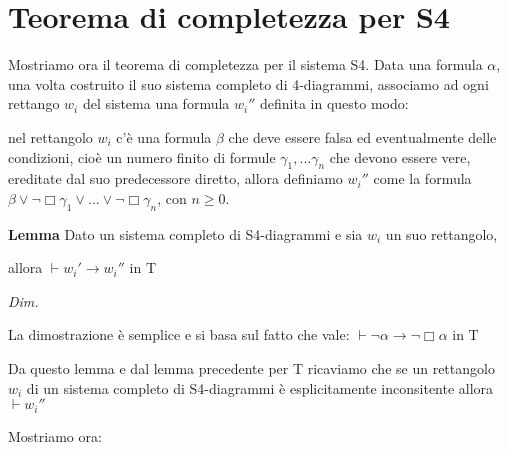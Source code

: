 \documentclass[a4paper, titlepage, 12pt]{report}
\begin{document}
\section{Teorema di completezza per S4}
Mostriamo ora il teorema di completezza per il sistema S4.
Data una formula $\alpha$, una volta costruito il suo sistema completo di 4-diagrammi,
associamo ad ogni rettango $w_i$ del sistema una formula $w_i''$ definita in questo modo:

nel rettangolo $w_i$ c'è una formula $\beta$ che deve essere falsa ed eventualmente delle condizioni,
cioè un numero finito di formule $\gamma_1, ...\gamma_n$ che devono essere vere, ereditate
dal suo predecessore diretto, allora definiamo $w_i''$ come la formula
$\beta \lor \neg \Box \gamma_1 \lor ... \lor \neg \Box \gamma_n$, con $n \geq 0$.

\begin{flushleft}
\textbf{Lemma}
Dato un sistema completo di S4-diagrammi e sia $w_i$ un suo rettangolo,

allora $\vdash w_i' \rightarrow w_i''$ in T

\textit{Dim.}

La dimostrazione è semplice e si basa sul fatto che vale:
$\vdash \neg \alpha \rightarrow \neg \Box \alpha$ in T

\end{flushleft}

Da questo lemma e dal lemma precedente per T ricaviamo che se un rettangolo $w_i$
di un sistema completo di S4-diagrammi è esplicitamente inconsitente
allora $\vdash w_i''$

Mostriamo ora:
\end{document}
